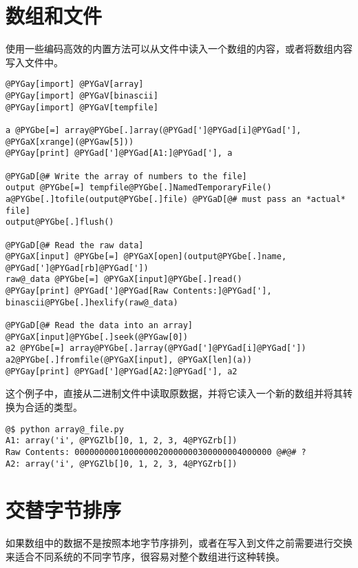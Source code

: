 \documentclass[a4paper,10pt,english]{manual}
\begin{document}
\section{数组和文件}

使用一些编码高效的内置方法可以从文件中读入一个数组的内容，或者将数组内容写入文件中。

\begin{Verbatim}[commandchars=@\[\]]
@PYGay[import] @PYGaV[array]
@PYGay[import] @PYGaV[binascii]
@PYGay[import] @PYGaV[tempfile]

a @PYGbe[=] array@PYGbe[.]array(@PYGad[']@PYGad[i]@PYGad['], @PYGaX[xrange](@PYGaw[5]))
@PYGay[print] @PYGad[']@PYGad[A1:]@PYGad['], a

@PYGaD[@# Write the array of numbers to the file]
output @PYGbe[=] tempfile@PYGbe[.]NamedTemporaryFile()
a@PYGbe[.]tofile(output@PYGbe[.]file) @PYGaD[@# must pass an *actual* file]
output@PYGbe[.]flush()

@PYGaD[@# Read the raw data]
@PYGaX[input] @PYGbe[=] @PYGaX[open](output@PYGbe[.]name, @PYGad[']@PYGad[rb]@PYGad['])
raw@_data @PYGbe[=] @PYGaX[input]@PYGbe[.]read()
@PYGay[print] @PYGad[']@PYGad[Raw Contents:]@PYGad['], binascii@PYGbe[.]hexlify(raw@_data)

@PYGaD[@# Read the data into an array]
@PYGaX[input]@PYGbe[.]seek(@PYGaw[0])
a2 @PYGbe[=] array@PYGbe[.]array(@PYGad[']@PYGad[i]@PYGad['])
a2@PYGbe[.]fromfile(@PYGaX[input], @PYGaX[len](a))
@PYGay[print] @PYGad[']@PYGad[A2:]@PYGad['], a2
\end{Verbatim}

这个例子中，直接从二进制文件中读取原数据，并将它读入一个新的数组并将其转换为合适的类型。

\begin{Verbatim}[commandchars=@\[\]]
@$ python array@_file.py
A1: array('i', @PYGZlb[]0, 1, 2, 3, 4@PYGZrb[])
Raw Contents: 0000000001000000020000000300000004000000 @#@# ?
A2: array('i', @PYGZlb[]0, 1, 2, 3, 4@PYGZrb[])
\end{Verbatim}


\section{交替字节排序}

如果数组中的数据不是按照本地字节序排列，或者在写入到文件之前需要进行交换来适合不同系统的不同字节序，很容易对整个数组进行这种转换。
\end{document}
